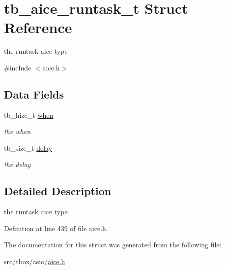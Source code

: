 \hypertarget{structtb__aice__runtask__t}{\section{tb\-\_\-aice\-\_\-runtask\-\_\-t Struct Reference}
\label{structtb__aice__runtask__t}
}


the runtask aice type  




{\ttfamily \#include $<$aice.\-h$>$}

\subsection*{Data Fields}
\begin{DoxyCompactItemize}
\item 
\hypertarget{structtb__aice__runtask__t_a67a1365403db823f751ce08d646a2749}{tb\-\_\-hize\-\_\-t \hyperlink{structtb__aice__runtask__t_a67a1365403db823f751ce08d646a2749}{when}}\label{structtb__aice__runtask__t_a67a1365403db823f751ce08d646a2749}

\begin{DoxyCompactList}\small\item\em the when \end{DoxyCompactList}\item 
\hypertarget{structtb__aice__runtask__t_a5a004476d87c475eb2b3244965353ffc}{tb\-\_\-size\-\_\-t \hyperlink{structtb__aice__runtask__t_a5a004476d87c475eb2b3244965353ffc}{delay}}\label{structtb__aice__runtask__t_a5a004476d87c475eb2b3244965353ffc}

\begin{DoxyCompactList}\small\item\em the delay \end{DoxyCompactList}\end{DoxyCompactItemize}


\subsection{Detailed Description}
the runtask aice type 

Definition at line 439 of file aice.\-h.



The documentation for this struct was generated from the following file\-:\begin{DoxyCompactItemize}
\item 
src/tbox/asio/\hyperlink{aice_8h}{aice.\-h}\end{DoxyCompactItemize}
